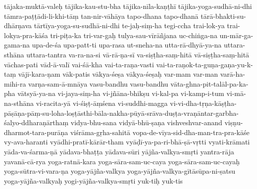{{tājaka-muktā-valeḥ
tājika-kau-stu-bha
tājika-nīla-kaṇṭhī
tājika-yoga-sudhā-ni-dhi
tāmra-paṭṭādi-li-khi-tāṃ
tan-nir-vāhāya
tapo-dhana
tapo-dhanā
tārā-bhakti-su-dhārṇava
tārtīya-yoga-su-sudhā-ni-dhi
te-jaḥ-siṃ-ha
tegi-ccha
trai-lok-ya
trai-lokya-pra-kāśa
tri-piṭa-ka
tri-var-gaḥ
tulya-sau-vīrāñjana
uc-chiṅga-na
un-mār-ga-gama-na
upa-de-śa
upa-patt-ti
upa-rasa
ut-sneha-na
utta-rā-dhyā-ya-na
uttara-sthāna
uttara-tantra
va-ra-na-si
vā-rā-ṇa-sī
va-siṣṭha-saṃ-hitā
vā-siṣṭha-saṃ-hitā
vāchas-pati
vād-ā-valī
vai-śā-kha
vai-ta-raṇa-vasti
vai-ta-raṇok-ta-guṇa-gaṇa-yu-k-taṃ
vājī-kara-ṇam
vāk-patis
vākya-śeṣa
vākya-śeṣaḥ
var-mam
var-man
varā-ha-mihi-ra
varṇa-sam-ā-mnāya
vasu-bandhu
vasu-bandhu
vāta-ghna-pit-talāl-pa-ka-pha
vātsyā-ya-na
vi-jaya-siṃ-ha
vi-jñāna-bhikṣu
vi-kal-pa
vi-kamp-i-tum
vi-mā-na-sthāna
vi-racita-yā
vi-śiṣṭ-āṃśena
vi-suddhi-magga
vi-vi-dha-tṛṇa-kāṣṭha-pāṣāṇa-pāṃ-su-loha-loṣṭāsthi-bāla-nakha-pūyā-srāva-duṣṭa-vraṇāntar-garbha-śalyo-ddharaṇārthaṃ
vidya-bhu-sana
vidyā-bhū-ṣaṇa
vishveshvar-anand
viṣṇu-dharmot-tara-purāṇa
viśrāma-gṛha-sahitā
vopa-de-vīya-sid-dha-man-tra-pra-kāśe
vy-ava-haranti
vyādhi-pratī-kārār-tham
vyāḍī-ya-pa-ri-bhā-ṣā-vṛtti
vyati-krāmati
yāda-va-śarma-ṇā
yādava-bhaṭṭa
yādava-sūri
yājña-valkya-smṛti
yantra-rāja
yavanā-cā-rya
yoga-ratnā-kara
yoga-sāra-sam-uc-caya
yoga-sāra-sam-uc-cayaḥ
yoga-sūtra-vi-vara-ṇa
yoga-yājña-valkya
yoga-yājña-valkya-gītāsūpa-ni-ṣatsu
yoga-yājña-valkyaḥ
yogi-yājña-valkya-smṛti
yuk-tiḥ
yuk-tis
}}
\normalfontlatin%
\endinput
